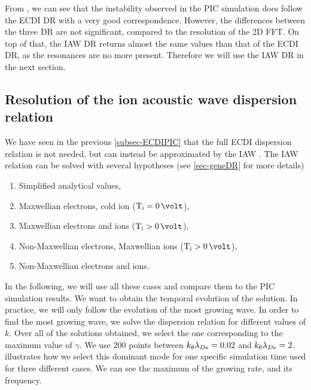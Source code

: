     From , we can see that the instability observed in the \ac{PIC} simulation does follow the \ac{ECDI} \ac{DR} with a very good correspondence.
    However, the differences between the three \ac{DR} are not significant, compared to the resolution of the \ac{2D} \ac{FFT}.
    On top of that, the \ac{IAW} \ac{DR} returns almost the same values than that of the \ac{ECDI} \ac{DR}, as the resonances are no more present.
    Therefore we will use the \ac{IAW} \ac{DR} in the next section.
    
  \FloatBarrier
  \subsection{Resolution of the ion acoustic wave dispersion relation} \label{subsec-VDFIAW}
  
    We have seen in the previous \cref{subsec-ECDIPIC} that the full \ac{ECDI} dispersion relation is not needed, but can instead be approximated by the \ac{IAW} \citep{lafleur2018,janhunen2018,taccogna2019}.
    The \ac{IAW} relation can be solved with several hypotheses (see \cref{sec-geneDR} for more details)
    \begin{enumerate}
      \item Simplified analytical values,
      \item Maxwellian electrons, cold ion ($\Ti = 0\,\volt$),
      \item Maxwellian electrons and ions ($\Ti > 0\,\volt$),
      \item Non-Maxwellian electrons, Maxwellian ions ($\Ti > 0\,\volt$),
      \item Non-Maxwellian electrons and ions.
    \end{enumerate}
    
    In the following, we will use all these cases and compare them to the \ac{PIC} simulation results.
    We want to obtain the temporal evolution of the solution.
    In practice, we will only follow the evolution of the most growing wave.
    In order to find the most growing wave, we solve the dispersion relation for different values of $k$.
    Over all of the solutions obtained, we select the one corresponding to the maximum value of $\gamma$.
    We use 200 points between $k_{\theta}\lambda_{De}=0.02 $ and $k_{\theta}\lambda_{De}= 2$.
     illustrates how we select this dominant mode for one specific simulation time used for three different cases.
    We can see the maximum of the growing rate, and its frequency.
    

